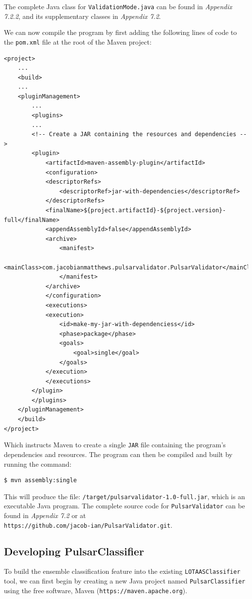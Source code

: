 \documentclass{article}
\begin{document}
\begin{appendices}
\begin{subappendices}
        The complete Java class for \verb|ValidationMode.java| can be found in \emph{Appendix 7.2.2}, and its supplementary classes in \emph{Appendix 7.2}.
        
        We can now compile the program by first adding the following lines of code to the \verb|pom.xml| file at the root of the Maven project:
        
        \begin{lstlisting}[numbers=none, title=pom.xml]
<project>
    ...
    <build>
    ...
    <pluginManagement>
        ...
        <plugins>
        ...
        <!-- Create a JAR containing the resources and dependencies -->
        <plugin>
            <artifactId>maven-assembly-plugin</artifactId>
            <configuration>
            <descriptorRefs>
                <descriptorRef>jar-with-dependencies</descriptorRef>
            </descriptorRefs>
            <finalName>${project.artifactId}-${project.version}-full</finalName>
            <appendAssemblyId>false</appendAssemblyId>
            <archive>
                <manifest>
                <mainClass>com.jacobianmatthews.pulsarvalidator.PulsarValidator</mainClass>
                </manifest>
            </archive>
            </configuration>
            <executions>
            <execution>
                <id>make-my-jar-with-dependenciess</id>
                <phase>package</phase>
                <goals>
                    <goal>single</goal>
                </goals>
            </execution>
            </executions>
        </plugin>
        </plugins>
    </pluginManagement>
    </build>
</project>
        \end{lstlisting}
        
        Which instructs Maven to create a single \verb|JAR| file containing the program's dependencies and resources. The program can then be compiled and built by running the command:
        
        \begin{lstlisting}[numbers=none]
$ mvn assembly:single
        \end{lstlisting}
        
        This will produce the file: \verb|/target/pulsarvalidator-1.0-full.jar|, which is an executable Java program. The complete source code for \verb|PulsarValidator| can be found in \emph{Appendix 7.2} or at \\\verb|https://github.com/jacob-ian/PulsarValidator.git|.

        \subsection{Developing PulsarClassifier}
        \label{apndx:pulsarclassifier}
        To build the ensemble classification feature into the existing \verb|LOTAASClassifier| tool, we can first begin by creating a new Java project named \verb|PulsarClassifier| using the free software, Maven (\verb|https://maven.apache.org|).


\end{subappendices}
\end{appendices}
\end{document}
